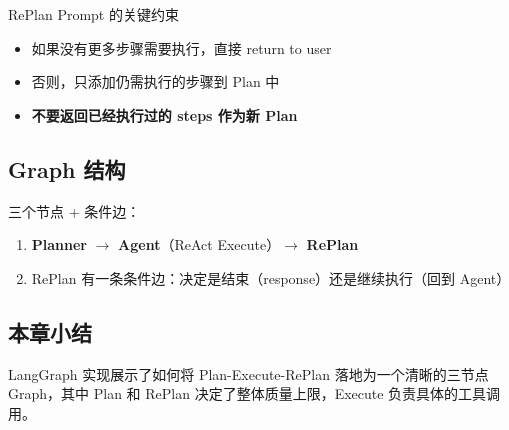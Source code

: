 \begin{warningbox}{RePlan Prompt 的关键约束}
\begin{itemize}
    \item 如果没有更多步骤需要执行，直接 return to user
    \item 否则，只添加仍需执行的步骤到 Plan 中
    \item \textbf{不要返回已经执行过的 steps 作为新 Plan}
\end{itemize}
\end{warningbox}

\subsection{Graph 结构}

三个节点 + 条件边：
\begin{enumerate}
    \item \textbf{Planner} $\rightarrow$ \textbf{Agent}（ReAct Execute）$\rightarrow$ \textbf{RePlan}
    \item RePlan 有一条条件边：决定是结束（response）还是继续执行（回到 Agent）
\end{enumerate}

\subsection{本章小结}

LangGraph 实现展示了如何将 Plan-Execute-RePlan 落地为一个清晰的三节点 Graph，其中 Plan 和 RePlan 决定了整体质量上限，Execute 负责具体的工具调用。

